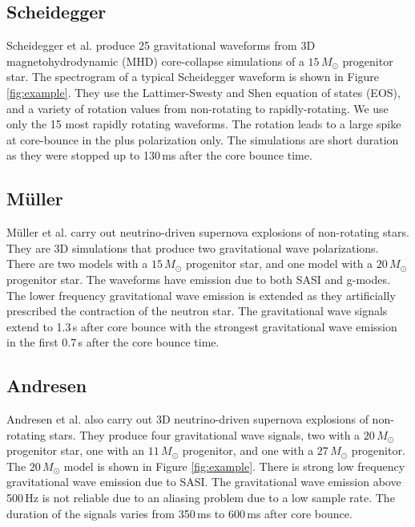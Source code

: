\documentclass[letterpaper, aps, prd, twocolumn, superscriptaddress, showpacs, nofootinbib]{revtex4}
\begin{document}
\subsection{Scheidegger}

Scheidegger et al. \cite{scheidegger:10b} produce 25 gravitational waveforms from 3D magnetohydrodynamic (MHD) core-collapse simulations of a $15\,M_{\odot}$ progenitor star. The spectrogram of a typical Scheidegger waveform is shown in Figure \ref{fig:example}. They use the Lattimer-Swesty and Shen equation of states (EOS), and a variety of rotation values from non-rotating to rapidly-rotating. We use only the 15 most rapidly rotating waveforms. The rotation leads to a large spike at core-bounce in the plus polarization only. The simulations are short duration as they were stopped up to 130\,ms after the core bounce time. 

\subsection{M\"uller}

M\"uller et al. \cite{mueller:e12} carry out neutrino-driven supernova explosions of non-rotating stars. They are 3D simulations that produce two gravitational wave polarizations. There are two models with a $15\,M_{\odot}$ progenitor star, and one model with a $20\,M_{\odot}$ progenitor star. The waveforms have emission due to both SASI and g-modes. The lower frequency gravitational wave emission is extended as they artificially prescribed the contraction of the neutron star. The gravitational wave signals extend to 1.3\,s after core bounce with the strongest gravitational wave emission in the first 0.7\,s after the core bounce time.    

\subsection{Andresen}

Andresen et al. \cite{andresen:16} also carry out 3D neutrino-driven supernova explosions of non-rotating stars. They produce four gravitational wave signals, two with a $20\,M_{\odot}$ progenitor star, one with an $11\,M_{\odot}$ progenitor, and one with a $27\,M_{\odot}$ progenitor. The $20\,M_{\odot}$ model is shown in Figure \ref{fig:example}. There is strong low frequency gravitational wave emission due to SASI. The gravitational wave emission above 500\,Hz is not reliable due to an aliasing problem due to a low sample rate. The duration of the signals varies from 350\,ms to 600\,ms after core bounce. 
\end{document}
